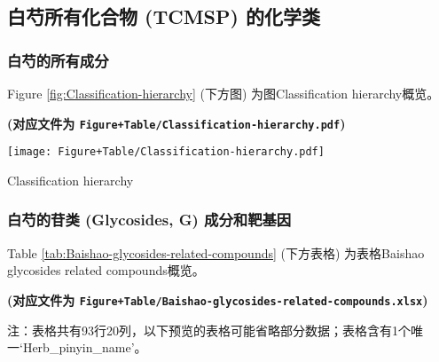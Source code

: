 \documentclass[
]{article}
\begin{document}
\hypertarget{ux767dux828dux6240ux6709ux5316ux5408ux7269-tcmsp-ux7684ux5316ux5b66ux7c7b}{%
\subsection{白芍所有化合物 (TCMSP) 的化学类}\label{ux767dux828dux6240ux6709ux5316ux5408ux7269-tcmsp-ux7684ux5316ux5b66ux7c7b}}

\hypertarget{ux767dux828dux7684ux6240ux6709ux6210ux5206}{%
\subsubsection{白芍的所有成分}\label{ux767dux828dux7684ux6240ux6709ux6210ux5206}}

Figure \ref{fig:Classification-hierarchy} (下方图) 为图Classification hierarchy概览。

\textbf{(对应文件为 \texttt{Figure+Table/Classification-hierarchy.pdf})}

\def\@captype{figure}
\begin{center}
\texttt{[image: Figure+Table/Classification-hierarchy.pdf]}
\caption{Classification hierarchy}\label{fig:Classification-hierarchy}
\end{center}

\hypertarget{ux767dux828dux7684ux82f7ux7c7b-glycosides-g-ux6210ux5206ux548cux9776ux57faux56e0}{%
\subsubsection{白芍的苷类 (Glycosides, G) 成分和靶基因}\label{ux767dux828dux7684ux82f7ux7c7b-glycosides-g-ux6210ux5206ux548cux9776ux57faux56e0}}

Table \ref{tab:Baishao-glycosides-related-compounds} (下方表格) 为表格Baishao glycosides related compounds概览。

\textbf{(对应文件为 \texttt{Figure+Table/Baishao-glycosides-related-compounds.xlsx})}

\begin{center}\begin{tcolorbox}[colback=gray!10, colframe=gray!50, width=0.9\linewidth, arc=1mm, boxrule=0.5pt]注：表格共有93行20列，以下预览的表格可能省略部分数据；表格含有1个唯一`Herb\_pinyin\_name'。
\end{tcolorbox}
\end{center}
\end{document}
